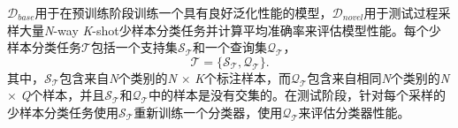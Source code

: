 $\mathcal{D}_{base}$用于在预训练阶段训练一个具有良好泛化性能的模型，$\mathcal{D}_{novel}$用于测试过程采样大量\emph{N}-way \emph{K}-shot少样本分类任务并计算平均准确率来评估模型性能。每个少样本分类任务$\mathcal{T}$包括一个支持集$\mathcal{S}_\mathcal{T}$和一个查询集$\mathcal{Q}_\mathcal{T}$，
\begin{equation}
  \mathcal{T} = \{\mathcal{S}_\mathcal{T}, \mathcal{Q}_\mathcal{T}\}.
\end{equation}
其中，$\mathcal{S}_\mathcal{T}$包含来自\emph{N}个类别的\emph{N} $\times$ \emph{K}个标注样本，而$\mathcal{Q}_\mathcal{T}$包含来自相同\emph{N}个类别的\emph{N} $\times$ \emph{Q}个样本，并且$\mathcal{S}_\mathcal{T}$和$\mathcal{Q}_\mathcal{T}$中的样本是没有交集的。在测试阶段，针对每个采样的少样本分类任务使用$\mathcal{S}_\mathcal{T}$重新训练一个分类器，使用$\mathcal{Q}_\mathcal{T}$来评估分类器性能。

